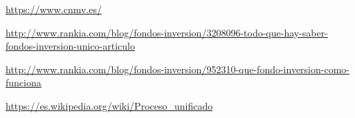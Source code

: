 \documentclass[12pt, a4paper]{article}
\begin{document}
\begin{thebibliography}{10}
	
	\bibitem[CNMV]{}
	\newline
	\href{https://www.cnmv.es/}{https://www.cnmv.es/}
	
	\bibitem[Rankia]{}
	\newline
	\href{http://www.rankia.com/blog/fondos-inversion/3208096-todo-que-hay-saber-fondos-inversion-unico-articulo}{http://www.rankia.com/blog/fondos-inversion/3208096-todo-que-hay-saber-fondos-inversion-unico-articulo}
	
	\bibitem[Rankia]{}
	\newline
	\href{http://www.rankia.com/blog/fondos-inversion/952310-que-fondo-inversion-como-funciona}{http://www.rankia.com/blog/fondos-inversion/952310-que-fondo-inversion-como-funciona}
	
	\bibitem[Wikipedia]{}
	\newline
	\href{https://es.wikipedia.org/wiki/Proceso\_unificado}{https://es.wikipedia.org/wiki/Proceso\_unificado}
	
\end{thebibliography}
\newpage
{}
\printglossary[type=\acronymtype]
\end{document}

